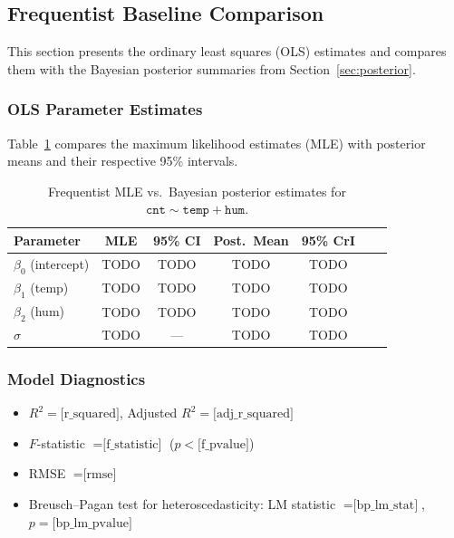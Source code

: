 \subsection{Frequentist Baseline Comparison}\label{sec:frequentist}

This section presents the ordinary least squares (OLS) estimates and compares them with the Bayesian posterior summaries from Section~\ref{sec:posterior}.

\subsubsection{OLS Parameter Estimates}

Table~\ref{tab:freq_vs_bayes} compares the maximum likelihood estimates (MLE) with posterior means and their respective 95\% intervals.

\begin{table}[htbp]
\centering
\caption{Frequentist MLE vs.\ Bayesian posterior estimates for $\texttt{cnt} \sim \texttt{temp} + \texttt{hum}$.}
\label{tab:freq_vs_bayes}
\begin{tabular}{lcccccc}
\hline
Parameter & MLE & 95\% CI & Post.\ Mean & 95\% CrI \\
\hline
$\beta_0$ (intercept) & TODO & TODO & TODO & TODO \\
$\beta_1$ (temp)       & TODO & TODO & TODO & TODO \\
$\beta_2$ (hum)        & TODO & TODO & TODO & TODO \\
$\sigma$               & TODO & --- & TODO & TODO \\
\hline
\end{tabular}
\end{table}

\subsubsection{Model Diagnostics}

\begin{itemize}
    \item $R^2 = \text{[r\_squared]}$, Adjusted $R^2 = \text{[adj\_r\_squared]}$
    \item $F$-statistic $= \text{[f\_statistic]}$ ($p < \text{[f\_pvalue]}$)
    \item RMSE $= \text{[rmse]}$
    \item Breusch--Pagan test for heteroscedasticity: LM statistic $= \text{[bp\_lm\_stat]}$, $p = \text{[bp\_lm\_pvalue]}$
\end{itemize}

